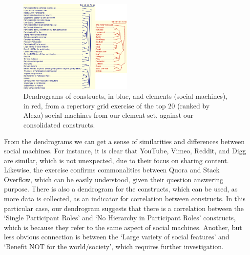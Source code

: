 \documentclass{sig-alternate}
\begin{document}
\begin{figure}[htb]
\begin{center}
\includegraphics[width=0.5\textwidth]{img/dendrogram-both.png}
\caption{Dendrograms of constructs, in blue, and elements (social machines), in red, from a repertory grid exercise of the top $20$ (ranked by Alexa) social machines from our element set, against our consolidated constructs.} \label{dendrogram}
\end{center}
\end{figure}

%

From the dendrograms we can get a sense of similarities and differences between social machines. For
instance, it is clear that YouTube, Vimeo, Reddit, and Digg are similar, which is not unexpected, due to their focus on sharing content. Likewise, the exercise confirms commonalities between Quora and Stack Overflow, which can be easily understood, given their question answering purpose. There is also a dendrogram for the constructs, which can be used, as more data is collected, as an indicator for correlation between constructs. In this particular case, our dendrogram suggests that there is a correlation between the `Single Participant Roles' and `No Hierarchy in Participant Roles' constructs, which is because they refer to the same aspect of social machines. Another, but less obvious connection is between the `Large variety of social features' and `Benefit NOT for the world/society', which requires further investigation.
\end{document}
